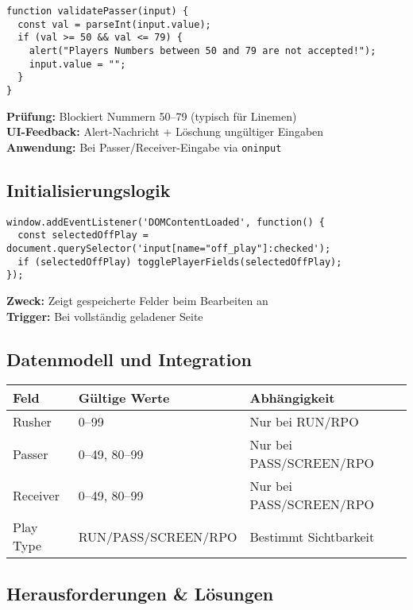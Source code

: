 \begin{verbatim}
function validatePasser(input) {
  const val = parseInt(input.value);
  if (val >= 50 && val <= 79) {
    alert("Players Numbers between 50 and 79 are not accepted!");
    input.value = "";
  }
}
\end{verbatim}

\textbf{Prüfung:} Blockiert Nummern 50–79 (typisch für Linemen) \\
\textbf{UI-Feedback:} Alert-Nachricht + Löschung ungültiger Eingaben \\
\textbf{Anwendung:} Bei Passer/Receiver-Eingabe via \texttt{oninput}


\subsection{Initialisierungslogik}

\begin{verbatim}
window.addEventListener('DOMContentLoaded', function() {
  const selectedOffPlay = document.querySelector('input[name="off_play"]:checked');
  if (selectedOffPlay) togglePlayerFields(selectedOffPlay);
});
\end{verbatim}

\textbf{Zweck:} Zeigt gespeicherte Felder beim Bearbeiten an \\
\textbf{Trigger:} Bei vollständig geladener Seite

\subsection{Datenmodell und Integration}

\begin{center}
\begin{tabular}{|l|l|l|}
\hline
\textbf{Feld} & \textbf{Gültige Werte} & \textbf{Abhängigkeit} \\
\hline
Rusher & 0–99 & Nur bei RUN/RPO \\
Passer & 0–49, 80–99 & Nur bei PASS/SCREEN/RPO \\
Receiver & 0–49, 80–99 & Nur bei PASS/SCREEN/RPO \\
Play Type & RUN/PASS/SCREEN/RPO & Bestimmt Sichtbarkeit \\
\hline
\end{tabular}
\end{center}

\subsection*{Herausforderungen \& Lösungen}

